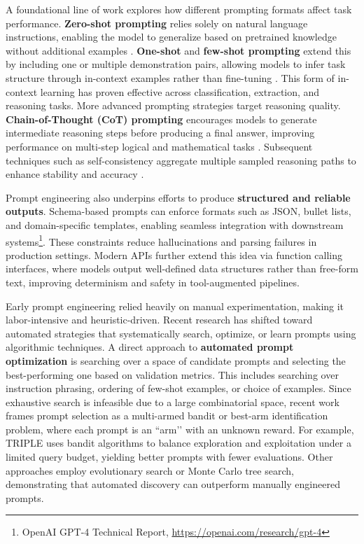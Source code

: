 A foundational line of work explores how different prompting formats affect task performance. \textbf{Zero-shot prompting} relies solely on natural language instructions, enabling the model to generalize based on pretrained knowledge without additional examples \cite{reynolds2021prompt}. \textbf{One-shot} and \textbf{few-shot prompting} extend this by including one or multiple demonstration pairs, allowing models to infer task structure through in-context examples rather than fine-tuning \cite{brown2020language}. This form of in-context learning has proven effective across classification, extraction, and reasoning tasks.
More advanced prompting strategies target reasoning quality. \textbf{Chain-of-Thought (CoT) prompting} encourages models to generate intermediate reasoning steps before producing a final answer, improving performance on multi-step logical and mathematical tasks \cite{wei2022cot}. Subsequent techniques such as self-consistency aggregate multiple sampled reasoning paths to enhance stability and accuracy \cite{wang2023selfconsistency}.

Prompt engineering also underpins efforts to produce \textbf{structured and reliable outputs}. Schema-based prompts can enforce formats such as JSON, bullet lists, and domain-specific templates, enabling seamless integration with downstream systems\footnote{OpenAI GPT-4 Technical Report, \url{https://openai.com/research/gpt-4}}. These constraints reduce hallucinations and parsing failures in production settings. Modern APIs further extend this idea via function calling interfaces, where models output well-defined data structures rather than free-form text, improving determinism and safety in tool-augmented pipelines.

Early prompt engineering relied heavily on manual experimentation, making it labor-intensive and heuristic-driven. Recent research has shifted toward automated strategies that systematically search, optimize, or learn prompts using algorithmic techniques. A direct approach to \textbf{automated prompt optimization} is searching over a space of candidate prompts and selecting the best-performing one based on validation metrics. This includes searching over instruction phrasing, ordering of few-shot examples, or choice of examples. Since exhaustive search is infeasible due to a large combinatorial space, recent work frames prompt selection as a multi-armed bandit or best-arm identification problem, where each prompt is an ``arm’’ with an unknown reward. For example, TRIPLE \cite{shi2024triple} uses bandit algorithms to balance exploration and exploitation under a limited query budget, yielding better prompts with fewer evaluations. Other approaches employ evolutionary search or Monte Carlo tree search, demonstrating that automated discovery can outperform manually engineered prompts.

